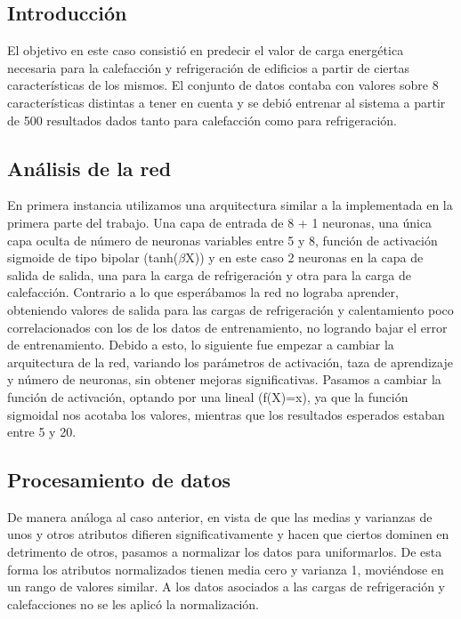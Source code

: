 \documentclass[onecolumn,10pt]{article}
\begin{document}
\subsection{Introducción}

El objetivo en este caso consistió en predecir el valor de carga energética necesaria para la calefacción y refrigeración de edificios a partir de ciertas características de los mismos. El conjunto de datos contaba con valores sobre 8 características distintas a tener en cuenta y se debió entrenar al sistema a partir de 500 resultados dados tanto para calefacción como para refrigeración.   



\subsection{Análisis de la red}

En primera instancia utilizamos una arquitectura similar a la implementada en la primera parte del trabajo. Una capa de entrada de 8 + 1 neuronas, una única capa oculta de número de neuronas variables entre 5 y 8, función de activación sigmoide de tipo bipolar (tanh($\beta$X)) y en este caso 2 neuronas en la capa de salida de salida, una para la carga de refrigeración y otra para la carga de calefacción. Contrario a lo que esperábamos la red no lograba aprender, obteniendo valores de salida para las cargas de refrigeración y calentamiento poco correlacionados con los de los datos de entrenamiento, no logrando bajar el error de entrenamiento. Debido a esto, lo siguiente fue empezar a cambiar la arquitectura de la red, variando los parámetros de activación, taza de aprendizaje y número de neuronas, sin obtener mejoras significativas.
Pasamos a cambiar la función de activación, optando por una lineal  (f(X)=x), ya que la función sigmoidal nos acotaba los valores, mientras que los resultados esperados estaban entre 5 y 20.


\subsection{Procesamiento de datos}

De manera análoga al caso anterior, en vista de que las medias y varianzas de unos y otros atributos difieren significativamente y hacen que ciertos dominen en detrimento de otros, pasamos a normalizar los datos para uniformarlos. De esta forma los atributos normalizados tienen media cero y varianza 1, moviéndose en un rango de valores similar. A los datos asociados a las cargas de refrigeración y calefacciones no se les aplicó la normalización.
\end{document}
